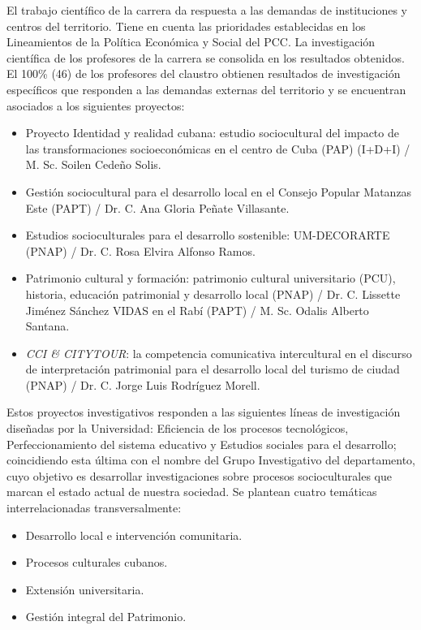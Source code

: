 El trabajo científico de la carrera da respuesta a las demandas de instituciones y centros del territorio. Tiene en cuenta las prioridades establecidas en los Lineamientos de la Política Económica y Social del PCC. La investigación científica de los profesores de la carrera se consolida en los resultados obtenidos. 
El 100\% (46) de los profesores del claustro obtienen resultados de investigación específicos que responden a las demandas externas del territorio y se encuentran asociados a los siguientes proyectos:

\begin{itemize}
	\setlength\itemsep{-0.5em}
	\item Proyecto Identidad y realidad cubana: estudio sociocultural del impacto de las transformaciones socioeconómicas en el centro de Cuba (PAP) (I+D+I) / M. Sc. Soilen Cedeño Solis.
	\item Gestión sociocultural para el desarrollo local en el Consejo Popular Matanzas Este (PAPT) / Dr. C. Ana Gloria Peñate Villasante.
	\item Estudios socioculturales para el desarrollo sostenible: UM-DECORARTE (PNAP) / Dr. C. Rosa Elvira Alfonso Ramos.
	\item Patrimonio cultural y formación: patrimonio cultural universitario (PCU), historia, educación patrimonial y desarrollo local (PNAP) / Dr. C. Lissette Jiménez Sánchez
	VIDAS en el Rabí (PAPT) / M. Sc. Odalis Alberto Santana.
	\item \emph{CCI \& CITYTOUR}:  la competencia comunicativa intercultural en el discurso de interpretación patrimonial para el desarrollo local del turismo de ciudad (PNAP) / Dr. C. Jorge Luis Rodríguez Morell.
	
\end{itemize}

Estos proyectos investigativos responden a las siguientes líneas de investigación diseñadas por la Universidad: Eficiencia de los procesos tecnológicos, Perfeccionamiento del sistema educativo y Estudios sociales para el desarrollo; coincidiendo esta última con el nombre del Grupo Investigativo del departamento, cuyo objetivo es desarrollar investigaciones sobre procesos socioculturales que marcan el estado actual de nuestra sociedad. Se plantean cuatro temáticas interrelacionadas transversalmente: 

\begin{itemize}
	\setlength\itemsep{-0.5em}
	\item Desarrollo local e intervención comunitaria.
	\item Procesos culturales cubanos.
	\item Extensión universitaria.
	\item Gestión integral del Patrimonio.
\end{itemize}

